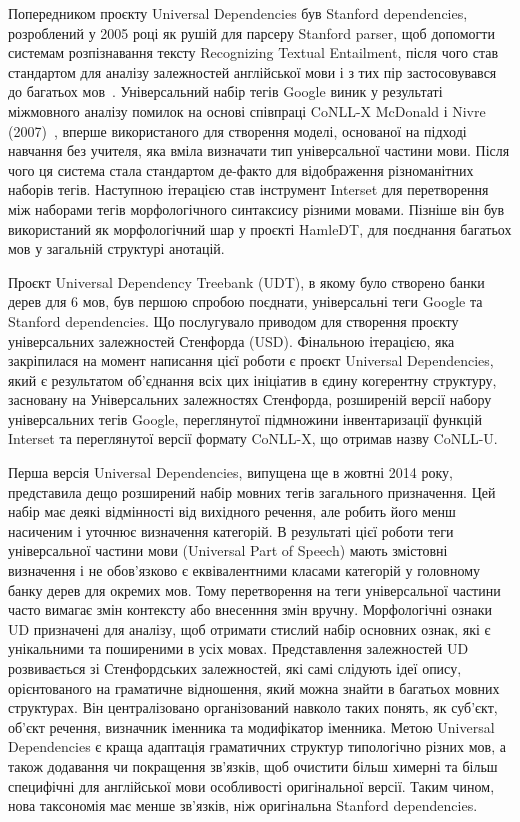 Попередником проєкту Universal Dependencies був Stanford dependencies, розроблений
у 2005 році як рушій для парсеру Stanford parser, щоб допомогти системам
розпізнавання тексту Recognizing Textual Entailment, після чого став стандартом
для аналізу залежностей англійської мови і з тих пір застосовувався до багатьох
мов~\cite{bib9}. Універсальний набір тегів Google виник у результаті міжмовного
аналізу помилок на основі співпраці CoNLL-X McDonald і Nivre (2007)~\cite{bib10},
вперше використаного для створення моделі, основаної на підході навчання без
учителя, яка вміла визначати тип універсальної частини мови. Після чого ця система
стала стандартом де-факто для відображення різноманітних наборів тегів. Наступною
ітерацією став інструмент Interset для перетворення між наборами тегів
морфологічного синтаксису різними мовами. Пізніше він був використаний як
морфологічний шар у проєкті HamleDT, для поєднання багатьох мов у загальній
структурі анотацій.

Проєкт Universal Dependency Treebank (UDT), в якому було створено банки дерев для
6 мов, був першою спробою поєднати, універсальні теги Google та Stanford
dependencies. Що послугувало приводом для створення проєкту універсальних
залежностей Стенфорда (USD). Фінальною ітерацією, яка закріпилася на момент
написання цієї роботи є проєкт Universal Dependencies, який є результатом
об’єднання всіх цих ініціатив в єдину когерентну структуру, засновану на
Універсальних залежностях Стенфорда, розширеній версії набору універсальних тегів
Google, переглянутої підмножини інвентаризації функцій Interset та переглянутої
версії формату CoNLL-X, що отримав назву CoNLL-U.

Перша версія Universal Dependencies, випущена ще в жовтні 2014 року, представила
дещо розширений набір мовних тегів загального призначення. Цей набір має деякі
відмінності від вихідного речення, але робить його менш насиченим і уточнює
визначення категорій. В результаті цієї роботи теги універсальної частини мови
(Universal Part of Speech) мають змістовні визначення і не обов'язково є
еквівалентними класами категорій у головному банку дерев для окремих мов. Тому
перетворення на теги універсальної частини часто вимагає змін контексту або
внесенння змін вручну. Морфологічні ознаки UD призначені для аналізу, щоб отримати
стислий набір основних ознак, які є унікальними та поширеними в усіх мовах.
Представлення залежностей UD розвивається зі Стенфордських залежностей, які самі
слідують ідеї опису, орієнтованого на граматичне відношення, який можна знайти в
багатьох мовних структурах. Він централізовано організований навколо таких понять,
як суб’єкт, об’єкт речення, визначник іменника та модифікатор іменника. Метою
Universal Dependencies є краща адаптація граматичних структур типологічно різних
мов, а також додавання чи покращення зв’язків, щоб очистити більш химерні та більш
специфічні для англійської мови особливості оригінальної версії. Таким чином, нова
таксономія має менше зв’язків, ніж оригінальна Stanford dependencies.

